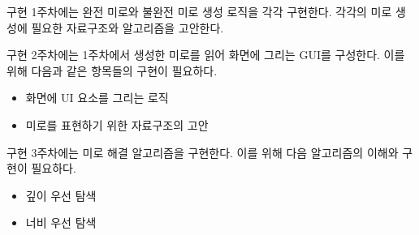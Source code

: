 구현 1주차에는 완전 미로와 불완전 미로 생성 로직을 각각 구현한다. 각각의 미로 생성에 필요한 자료구조와 알고리즘을 고안한다.

구현 2주차에는 1주차에서 생성한 미로를 읽어 화면에 그리는 GUI를 구성한다. 이를 위해 다음과 같은 항목들의 구현이 필요하다.
\begin{itemize}
    \item 화면에 UI 요소를 그리는 로직
    \item 미로를 표현하기 위한 자료구조의 고안
\end{itemize}

구현 3주차에는 미로 해결 알고리즘을 구현한다. 이를 위해 다음 알고리즘의 이해와 구현이 필요하다.
\begin{itemize}
    \item 깊이 우선 탐색
    \item 너비 우선 탐색
\end{itemize}